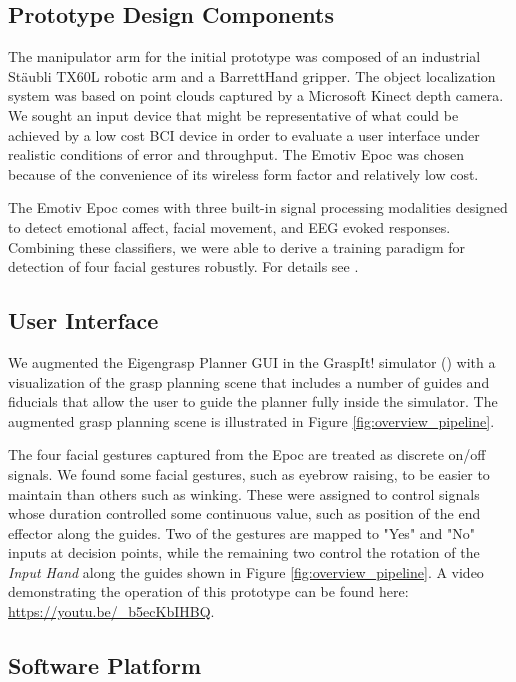 \subsection{Prototype Design Components}
The manipulator arm for the initial prototype was composed of an industrial St\"{a}ubli TX60L robotic arm and a BarrettHand gripper. The object localization system was based on point clouds captured by a Microsoft Kinect depth camera. We sought an input device that might be representative of what could be achieved by a low cost BCI device in order to evaluate a user interface under realistic conditions of error and throughput. The Emotiv Epoc was chosen because of the convenience of its wireless form factor and relatively low cost. 

The Emotiv Epoc comes with three built-in signal processing modalities designed to detect emotional affect, facial movement, and EEG evoked responses. Combining these classifiers, we were able to derive a training paradigm for detection of four facial gestures robustly. For details see \cite{Weisz2013}.

\subsection{User Interface}
We augmented the Eigengrasp Planner GUI in the GraspIt! simulator (\cite{Miller2004}) with a visualization of the grasp planning scene that includes a number of guides and fiducials that allow the user to guide the planner fully inside the simulator. The augmented grasp planning scene is illustrated in Figure \ref{fig:overview_pipeline}. 

The four facial gestures captured from the Epoc are treated as discrete on/off signals. We found some facial gestures, such as eyebrow raising, to be easier to maintain than others such as winking. These were assigned to control signals whose duration controlled some continuous value, such as position of the end effector along the guides. Two of the gestures are mapped to "Yes" and "No" inputs at decision points, while the remaining two control the rotation of the \emph{Input Hand} along the guides shown in Figure \ref{fig:overview_pipeline}. A video demonstrating the operation of this prototype can be found here: \url{https://youtu.be/_b5ecKbIHBQ}.

\subsection{Software Platform}

